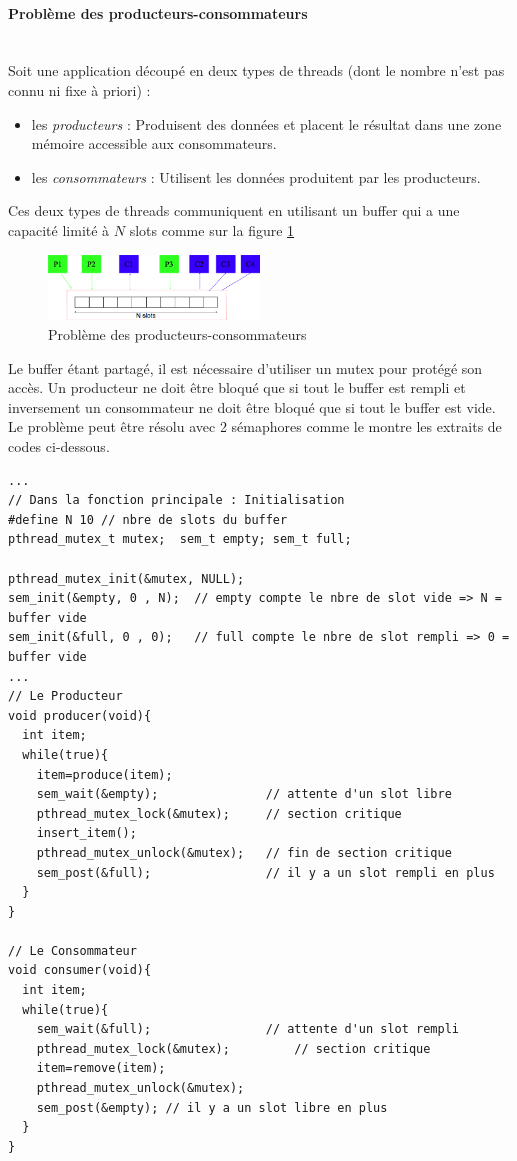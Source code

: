 \paragraph{Problème des producteurs-consommateurs}~\\
Soit une application découpé en deux types de threads (dont le nombre n'est pas connu ni fixe à priori) :
\begin{itemize}
  \item les \textit{producteurs} : Produisent des données et placent le résultat dans une zone mémoire accessible aux consommateurs.
  \item les \textit{consommateurs} : Utilisent les données produitent par les producteurs.
\end{itemize}
Ces deux types de threads communiquent en utilisant un buffer qui a une capacité limité à $N$ slots comme sur la figure \ref{fig:prodcons}
\begin{figure}[h!]
  \centering\includegraphics[width=0.5\textwidth]{prodcons}
  \caption{\label{fig:prodcons}Problème des producteurs-consommateurs}
\end{figure}
Le buffer étant partagé, il est nécessaire d'utiliser un mutex pour protégé son accès.
Un producteur ne doit être bloqué que si tout le buffer est rempli et inversement un consommateur ne doit être bloqué que si tout le buffer est vide.
Le problème peut être résolu avec 2 sémaphores comme le montre les extraits de codes ci-dessous.
\begin{lstlisting}
...
// Dans la fonction principale : Initialisation
#define N 10 // nbre de slots du buffer
pthread_mutex_t mutex; 	sem_t empty; sem_t full;

pthread_mutex_init(&mutex, NULL);
sem_init(&empty, 0 , N);  // empty compte le nbre de slot vide => N = buffer vide
sem_init(&full, 0 , 0);   // full compte le nbre de slot rempli => 0 = buffer vide
...
// Le Producteur
void producer(void){
  int item;
  while(true){
    item=produce(item);
    sem_wait(&empty); 				// attente d'un slot libre
    pthread_mutex_lock(&mutex);  	// section critique
    insert_item();
    pthread_mutex_unlock(&mutex);	// fin de section critique
    sem_post(&full); 				// il y a un slot rempli en plus
  }
}

// Le Consommateur
void consumer(void){
  int item;
  while(true){
    sem_wait(&full); 				// attente d'un slot rempli
    pthread_mutex_lock(&mutex); 		// section critique
    item=remove(item);
    pthread_mutex_unlock(&mutex);
    sem_post(&empty); // il y a un slot libre en plus
  }
}
\end{lstlisting}

